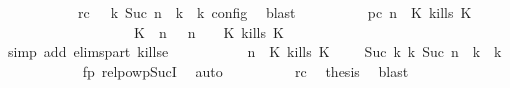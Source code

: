 \begin{isabellebody}
\ \ \ \ \ \ \ \ \ \ \ rc{\isacharcolon}{\isacartoucheopen}{\isasymrho}\ {\isasymin}\ {\isasymlbrakk}\ {\isasymGamma}\isactrlsub k{\isacharcomma}\ Suc\ n\ {\isasymturnstile}\ {\isasymPsi}\isactrlsub k\ {\isasymtriangleright}\ {\isasymPhi}\isactrlsub k\ {\isasymrbrakk}\isactrlsub c\isactrlsub o\isactrlsub n\isactrlsub f\isactrlsub i\isactrlsub g{\isacartoucheclose}\ \isamarkupfalse%
\ blast\isanewline
\ \ \ \ \ \ \ \ \isamarkupfalse%
\ pc{\isacharcolon}{\isacartoucheopen}{\isacharparenleft}{\isasymGamma}{\isacharcomma}\ n\ {\isasymturnstile}\ {\isacharparenleft}K\ kills\ K\ {\isacharhash}\ {\isasymPsi}\ {\isasymtriangleright}\ {\isasymPhi}{\isacharparenright}\isanewline
\ \ \ \ \ \ \ \ \ \ \ \ \ \ \ \ \ \ {\isasymhookrightarrow}\ {\isacharparenleft}{\isacharparenleft}{\isacharparenleft}K\ {\isasymnot}{\isasymUp}\ n{\isacharparenright}\ {\isacharhash}\ {\isasymGamma}{\isacharparenright}{\isacharcomma}\ n\ {\isasymturnstile}\ {\isasymPsi}\ {\isasymtriangleright}\ {\isacharparenleft}{\isacharparenleft}K\ kills\ K\ {\isacharhash}\ {\isasymPhi}{\isacharparenright}{\isacharparenright}{\isacartoucheclose}\isanewline
\ \ \ \ \ \ \ \ \ \ \isamarkupfalse%
\ {\isacharparenleft}simp\ add{\isacharcolon}\ elims{\isacharunderscore}part\ kills{\isacharunderscore}e{}{\isacharparenright}\isanewline
\ \ \ \ \ \ \ \ \isamarkupfalse%
\ {\isacartoucheopen}{\isacharparenleft}{\isasymGamma}{\isacharcomma}\ n\ {\isasymturnstile}\ {\isacharparenleft}K\ kills\ K\ {\isacharhash}\ {\isasymPsi}\ {\isasymtriangleright}\ {\isasymPhi}{\isacharparenright}\ {\isasymhookrightarrow}\isactrlbsup Suc\ k\isactrlesup \ {\isacharparenleft}{\isasymGamma}\isactrlsub k{\isacharcomma}\ Suc\ n\ {\isasymturnstile}\ {\isasymPsi}\isactrlsub k\ {\isasymtriangleright}\ {\isasymPhi}\isactrlsub k{\isacharparenright}{\isacartoucheclose}\isanewline
\ \ \ \ \ \ \ \ \ \ \isamarkupfalse%
\ fp\ relpowp{\isacharunderscore}Suc{\isacharunderscore}I{}\ \isamarkupfalse%
\ auto\isanewline
\ \ \ \ \ \ \ \ \isamarkupfalse%
\ rc\ \isamarkupfalse%
\ {\isacharquery}thesis\ \isamarkupfalse%
\ blast\isanewline
\ \ \ \ \ \ \isamarkupfalse%
\isanewline
\ \ \ \ \ \ \isamarkupfalse%

\end{isabellebody}
